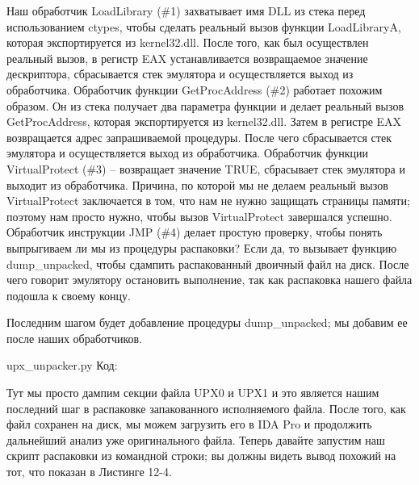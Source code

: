 \documentclass[12pt]{book}
\begin{document}
Наш обработчик LoadLibrary (\#1) захватывает имя DLL из стека перед использованием ctypes, чтобы сделать реальный вызов функции LoadLibraryA, которая экспортируется из kernel32.dll. После того, как был осуществлен реальный вызов, в регистр EAX устанавливается возвращаемое значение дескриптора, сбрасывается стек эмулятора и осуществляется выход из обработчика. Обработчик функции GetProcAddress (\#2) работает похожим образом. Он из стека получает два параметра функции и делает реальный вызов GetProcAddress, которая экспортируется из kernel32.dll. Затем в регистре EAX возвращается адрес запрашиваемой процедуры. После чего сбрасывается стек эмулятора и осуществляется выход из обработчика. Обработчик функции VirtualProtect (\#3) – возвращает значение TRUE, сбрасывает стек эмулятора и выходит из обработчика. Причина, по которой мы не делаем реальный вызов VirtualProtect заключается в том, что нам не нужно защищать страницы памяти; поэтому нам просто нужно, чтобы вызов VirtualProtect завершался успешно. Обработчик инструкции JMP (\#4) делает простую проверку, чтобы понять выпрыгиваем ли мы из процедуры распаковки? Если да, то вызывает функцию dump\_unpacked, чтобы сдампить распакованный двоичный файл на диск. После чего говорит эмулятору остановить выполнение, так как распаковка нашего файла подошла к своему концу.

Последним шагом будет добавление процедуры dump\_unpacked; мы добавим ее после наших обработчиков.

upx\_unpacker.py
Код:









Тут мы просто дампим секции файла UPX0 и UPX1 и это является нашим последний шаг в распаковке запакованного исполняемого файла. После того, как файл сохранен на диск, мы можем загрузить его в IDA Pro и продолжить дальнейший анализ уже оригинального файла. Теперь давайте запустим наш скрипт распаковки из командной строки; вы должны видеть вывод похожий на тот, что показан в Листинге 12-4.
\end{document}
